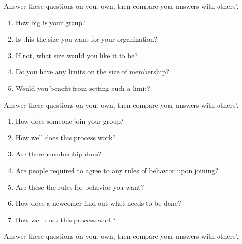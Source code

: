 
Answer these questions on your own,
then compare your answers with others'.

\begin{enumerate}

\item
  How big is your group?

\item
  Is this the size you want for your organization?

\item
  If not, what size would you like it to be?

\item
  Do you have any limits on the size of membership?

\item
  Would you benefit from setting such a limit?

\end{enumerate}


Answer these questions on your own,
then compare your answers with others'.

\begin{enumerate}

\item
  How does someone join your group?

\item
  How well does this process work?

\item
  Are there membership dues?

\item
  Are people required to agree to any rules of behavior upon joining?

\item
  Are these the rules for behavior you want?

\item
  How does a newcomer find out what needs to be done?

\item
  How well does this process work?
  
\end{enumerate}


Answer these questions on your own,
then compare your answers with others'.

